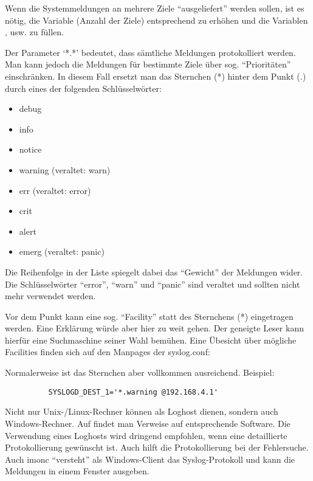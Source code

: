 \begin{description}
  Wenn die Systemmeldungen an mehrere Ziele ``ausgeliefert'' werden sollen,
  ist es nötig, die Variable  (Anzahl der Ziele) entsprechend zu erhöhen
  und die Variablen ,  usw. zu füllen.

  Der Parameter `*.*' bedeutet, dass sämtliche Meldungen protokolliert
  werden. Man kann jedoch die Meldungen für bestimmte Ziele
  über sog. ``Prioritäten'' einschränken. In diesem Fall ersetzt man
  das Sternchen (*) hinter dem Punkt (.) durch eines der folgenden
  Schlüsselwörter:
  \begin{itemize}
  \item debug
  \item info
  \item notice
  \item warning (veraltet: warn)
  \item err (veraltet: error)
  \item crit
  \item alert
  \item emerg (veraltet: panic)
  \end{itemize}

  Die Reihenfolge in der Liste spiegelt dabei das ``Gewicht'' der
  Meldungen wider. Die Schlüsselwörter ``error'', ``warn'' und ``panic'' sind
  veraltet und sollten nicht mehr verwendet werden.

  Vor dem Punkt kann eine sog. ``Facility'' statt des Sternchens (*)
  eingetragen werden. Eine Erklärung würde aber hier zu weit gehen.
  Der geneigte Leser kann hierfür eine Suchmaschine seiner Wahl
  bemühen. Eine Übesicht über mögliche Facilities
  finden sich auf den Manpages der syslog.conf:

  \enlargethispage{\baselineskip}
  \noindent {}

  Normalerweise ist das Sternchen aber vollkommen ausreichend. Beispiel:
\begin{example}
\begin{verbatim}
          SYSLOGD_DEST_1='*.warning @192.168.4.1'
\end{verbatim}
\end{example}
  Nicht nur Unix-/Linux-Rechner können als Loghost dienen, sondern
  auch Windows-Rechner. Auf  findet man
  Verweise auf entsprechende Software. Die Verwendung eines
  Loghosts wird dringend empfohlen, wenn eine detaillierte
  Protokollierung gewünscht ist. Auch hilft die Protokollierung bei
  der Fehlersuche. Auch imonc ``versteht'' als
  Windows-Client das Syslog-Protokoll und kann die Meldungen in einem
  Fenster ausgeben.


\end{description}
